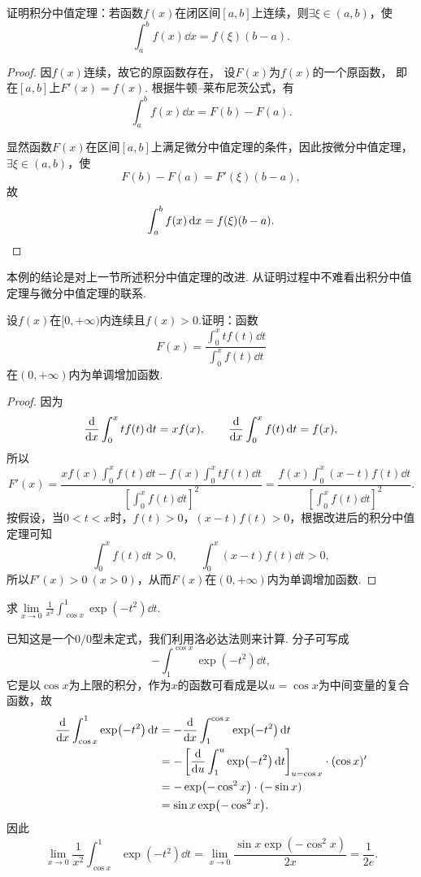 \begin{example}
证明积分中值定理：若函数\(f(x)\)在闭区间\([a,b]\)上连续，则\(\exists\xi\in(a,b)\)，使\[
\int_a^b f(x) \dd{x} = f(\xi) (b-a).
\]
\begin{proof}
因\(f(x)\)连续，故它的原函数存在，
设\(F(x)\)为\(f(x)\)的一个原函数，
即在\([a,b]\)上\(F'(x) = f(x)\).
根据牛顿--莱布尼茨公式，有\[
	\int_a^b f(x) \dd{x}
	= F(b) - F(a).
\]

显然函数\(F(x)\)在区间\([a,b]\)上满足微分中值定理的条件，因此按微分中值定理，\(\exists\xi\in(a,b)\)，使\[
F(b) - F(a) = F'(\xi) (b-a),
\]故\[
\int_a^b f(x) \dd{x} = f(\xi) (b-a).
\qedhere
\]
\end{proof}
\end{example}
本例的结论是对上一节所述积分中值定理的改进.
从证明过程中不难看出积分中值定理与微分中值定理的联系.

\begin{example}
\def\fu{\displaystyle \int_0^x t f(t) \dd{t}}
\def\fv{\displaystyle \int_0^x f(t) \dd{t}}
\def\fvv{\left[ \fv \right]^2}
\def\fw{\displaystyle \int_0^x (x-t) f(t) \dd{t}}
设\(f(x)\)在\([0,+\infty)\)内连续且\(f(x) > 0\).证明：函数\[
F(x) = \frac{\fu}{\fv}
\]在\((0,+\infty)\)内为单调增加函数.
\begin{proof}
因为\[
\dv{x} \fu = x f(x),
\qquad
\dv{x} \fv = f(x),
\]所以\[
F'(x) = \frac{x f(x) \fv - f(x) \fu}{\fvv}
= \frac{f(x) \fw}{\fvv}.
\]按假设，当\(0 < t < x\)时，\(f(t) > 0\)，\((x-t) f(t) > 0\)，根据改进后的积分中值定理可知\[
\fv > 0, \qquad \fw > 0,
\]所以\(F'(x) > 0\ (x > 0)\)，从而\(F(x)\)在\((0,+\infty)\)内为单调增加函数.
\end{proof}
\end{example}

\begin{example}
求\(\lim\limits_{x\to0} \frac{1}{x^2} \int_{\cos x}^1 \exp(-t^2) \dd{t}\).
\begin{solution}
已知这是一个\(0/0\)型未定式，我们利用洛必达法则来计算.
分子可写成\[
- \int_1^{\cos x} \exp(-t^2) \dd{t},
\]它是以\(\cos x\)为上限的积分，作为\(x\)的函数可看成是以\(u = \cos x\)为中间变量的复合函数，故\begin{align*}
\dv{x} \int_{\cos x}^1 \exp(-t^2) \dd{t}
&= -\dv{x} \int_1^{\cos x} \exp(-t^2) \dd{t} \\
&= -\left[ \dv{u}\int_1^u \exp(-t^2) \dd{t} \right]_{u=\cos x} \cdot (\cos x)' \\
&= -\exp(-\cos^2 x) \cdot (-\sin x) \\
&= \sin x \exp(-\cos^2 x).
\end{align*}
因此\[
\lim\limits_{x\to0} \frac{1}{x^2} \int_{\cos x}^1 \exp(-t^2) \dd{t}
= \lim\limits_{x\to0} \frac{\sin x \exp(-\cos^2 x)}{2x}
= \frac{1}{2e}.
\]
\end{solution}
\end{example}

